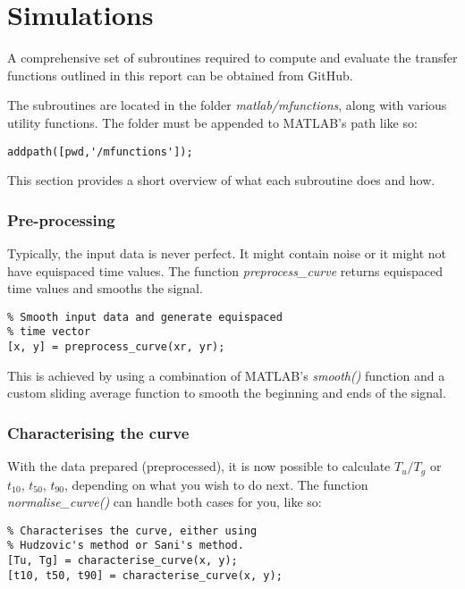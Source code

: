 \section{Simulations}

A comprehensive set of subroutines required to compute and evaluate the transfer
functions    outlined    in    this    report    can     be     obtained    from
GitHub\cite{ref:TheComet93}.

The subroutines are located in the folder \textit{matlab/mfunctions}, along with
various utility functions. The folder must be appended to MATLAB's path like so:

\begin{lstlisting}
addpath([pwd,'/mfunctions']);
\end{lstlisting}

This section provides a short overview  of  what  each  subroutine does and how.


\subsubsection*{Pre-processing}

Typically, the  input  data is never perfect. It might contain noise or it might
not have equispaced time values. The function \textit{preprocess\_curve} returns
equispaced time values and smooths the signal.

\begin{lstlisting}
% Smooth input data and generate equispaced
% time vector
[x, y] = preprocess_curve(xr, yr);
\end{lstlisting}

This is achieved  by  using a combination of MATLAB's \textit{smooth()} function
and a custom sliding average  function  to  smooth the beginning and ends of the
signal.


\subsubsection*{Characterising the curve}

With the data prepared (preprocessed), it is now possible to calculate $T_u/T_g$
or $t_{10}$, $t_{50}$, $t_{90}$, depending on  what  you  wish  to  do next. The
function  \textit{normalise\_curve()}  can  handle  both cases for you, like so:

\begin{lstlisting}
% Characterises the curve, either using
% Hudzovic's method or Sani's method.
[Tu, Tg] = characterise_curve(x, y);
[t10, t50, t90] = characterise_curve(x, y);
\end{lstlisting}

